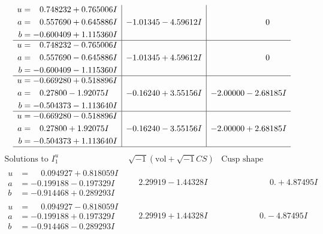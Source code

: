 \documentclass[1p]{elsarticle_modified}
\theoremstyle{definition}
\newcommand{\I}{\sqrt{-1}}
\begin{document}
$$\begin{array}{c|c|c}
\begin{aligned}
u &= \phantom{-}0.748232 + 0.765006 I \\
a &= \phantom{-}0.557690 + 0.645886 I \\
b &= -0.600409 + 1.115360 I\end{aligned}
 & -1.01345 - 4.59612 I & \phantom{-0.000000 } 0 \\ \hline\begin{aligned}
u &= \phantom{-}0.748232 - 0.765006 I \\
a &= \phantom{-}0.557690 - 0.645886 I \\
b &= -0.600409 - 1.115360 I\end{aligned}
 & -1.01345 + 4.59612 I & \phantom{-0.000000 } 0 \\ \hline\begin{aligned}
u &= -0.669280 + 0.518896 I \\
a &= \phantom{-}0.27800 - 1.92075 I \\
b &= -0.504373 - 1.113640 I\end{aligned}
 & -0.16240 + 3.55156 I & -2.00000 - 2.68185 I \\ \hline\begin{aligned}
u &= -0.669280 - 0.518896 I \\
a &= \phantom{-}0.27800 + 1.92075 I \\
b &= -0.504373 + 1.113640 I\end{aligned}
 & -0.16240 - 3.55156 I & -2.00000 + 2.68185 I\\
 \hline 
 \end{array}$$\newpage$$\begin{array}{c|c|c}  
\text{Solutions to }I^u_{1}& \I (\text{vol} + \sqrt{-1}CS) & \text{Cusp shape}\\
 \hline 
\begin{aligned}
u &= \phantom{-}0.094927 + 0.818059 I \\
a &= -0.199188 - 0.197329 I \\
b &= -0.914468 + 0.289293 I\end{aligned}
 & \phantom{-}2.29919 - 1.44328 I & \phantom{-0.000000 -}0. + 4.87495 I \\ \hline\begin{aligned}
u &= \phantom{-}0.094927 - 0.818059 I \\
a &= -0.199188 + 0.197329 I \\
b &= -0.914468 - 0.289293 I\end{aligned}
 & \phantom{-}2.29919 + 1.44328 I & \phantom{-0.000000 } 0. - 4.87495 I \\ \hline\begin{aligned}

\end{aligned}
\end{array}$$
\end{document}
